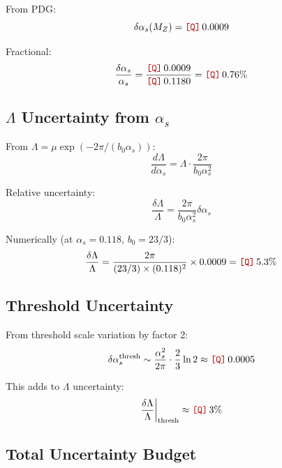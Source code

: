 \documentclass[11pt,a4paper]{article}
\newcommand{\Qnum}[1]{\textcolor{red!70!black}{\texttt{[Q]}}\,#1}
\theoremstyle{definition}
\begin{document}
From PDG:
\begin{equation}
\label{eq:alpha-pdg-uncert}
\delta\alpha_s(M_Z) = \Qnum{0.0009}
\end{equation}

Fractional:
\begin{equation}
\label{eq:alpha-frac-uncert}
\frac{\delta\alpha_s}{\alpha_s} = \frac{\Qnum{0.0009}}{\Qnum{0.1180}} = \Qnum{0.76\%}
\end{equation}

\subsection{$\Lambda$ Uncertainty from $\alpha_s$}
\label{subsec:lambda-from-alpha}

From $\Lambda = \mu \exp(-2\pi/(b_0\alpha_s))$:
\begin{equation}
\label{eq:d-lambda-d-alpha}
\frac{d\Lambda}{d\alpha_s} = \Lambda \cdot \frac{2\pi}{b_0\alpha_s^2}
\end{equation}

Relative uncertainty:
\begin{equation}
\label{eq:lambda-rel-uncert}
\frac{\delta\Lambda}{\Lambda} = \frac{2\pi}{b_0\alpha_s^2}\delta\alpha_s
\end{equation}

Numerically (at $\alpha_s = 0.118$, $b_0 = 23/3$):
\begin{equation}
\label{eq:lambda-uncert-num}
\frac{\delta\Lambda}{\Lambda} = \frac{2\pi}{(23/3) \times (0.118)^2} \times 0.0009 = \Qnum{5.3\%}
\end{equation}

\subsection{Threshold Uncertainty}
\label{subsec:threshold-uncert-app}

From threshold scale variation by factor 2:
\begin{equation}
\label{eq:thresh-scale-uncert}
\delta\alpha_s^{\text{thresh}} \sim \frac{\alpha_s^2}{2\pi} \cdot \frac{2}{3}\ln 2 \approx \Qnum{0.0005}
\end{equation}

This adds to $\Lambda$ uncertainty:
\begin{equation}
\label{eq:thresh-lambda-contrib}
\frac{\delta\Lambda}{\Lambda}\bigg|_{\text{thresh}} \approx \Qnum{3\%}
\end{equation}

\subsection{Total Uncertainty Budget}
\label{subsec:total-budget}
\end{document}
